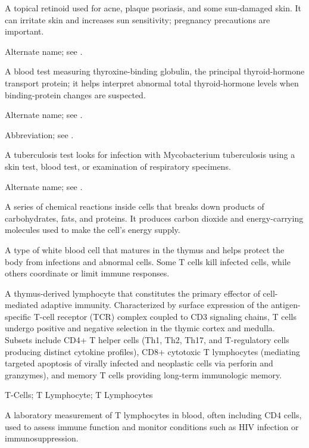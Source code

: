  A topical retinoid used for acne, plaque psoriasis, and some sun-damaged skin. It can irritate skin and increases sun sensitivity; pregnancy precautions are important.

 Alternate name; see .

 A blood test measuring thyroxine-binding globulin, the principal thyroid-hormone transport protein; it helps interpret abnormal total thyroid-hormone levels when binding-protein changes are suspected.

 Alternate name; see .

 Abbreviation; see .

 A tuberculosis test looks for infection with Mycobacterium tuberculosis using a skin test, blood test, or examination of respiratory specimens.

 Alternate name; see .

 A series of chemical reactions inside cells that breaks down products of carbohydrates, fats, and proteins. It produces carbon dioxide and energy-carrying molecules used to make the cell’s energy supply.

 A type of white blood cell that matures in the thymus and helps protect the body from infections and abnormal cells. Some T cells kill infected cells, while others coordinate or limit immune responses.

 A thymus-derived lymphocyte that constitutes the primary effector of cell-mediated adaptive immunity. Characterized by surface expression of the antigen-specific T-cell receptor (TCR) complex coupled to CD3 signaling chains, T cells undergo positive and negative selection in the thymic cortex and medulla. Subsets include CD4+ T helper cells (Th1, Th2, Th17, and T-regulatory cells producing distinct cytokine profiles), CD8+ cytotoxic T lymphocytes (mediating targeted apoptosis of virally infected and neoplastic cells via perforin and granzymes), and memory T cells providing long-term immunologic memory.

\synonyms
T-Cells; T Lymphocyte; T Lymphocytes

 A laboratory measurement of T lymphocytes in blood, often including CD4 cells, used to assess immune function and monitor conditions such as HIV infection or immunosuppression.

